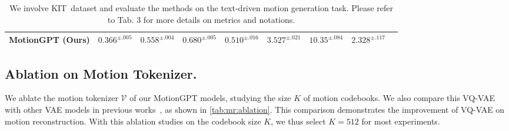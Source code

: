 \begin{table}[h]
{\begin{tabular}{@{}lcccccccc@{}}
\midrule
MotionGPT (Ours) &
$0.366^{\pm.005}$ & $0.558^{\pm.004}$ & $0.680^{\pm.005}$ & $0.510^{\pm.016}$ & $3.527^{\pm.021}$ & $10.35^{\pm.084}$ & 
$2.328^{\pm.117}$
\\\bottomrule
\end{tabular}%
}
\vspace{8pt}
\caption{We involve KIT~\cite{Plappert2016kit}dataset and evaluate the methods on the text-driven motion generation task. Please refer to Tab. 3 for more details on metrics and notations.
}
\label{tab:tm:comp:kit}
\end{table}
     
\subsection{Ablation on Motion Tokenizer.} 
\label{sec:vqvae}
We ablate the motion tokenizer $\mathcal{V}$ of our MotionGPT models, studying the size $K$ of motion codebooks. We also compare this VQ-VAE with other VAE models in previous works~\cite{vposer_SMPL-X:2019, petrovich21actor, chen2023mld}, as shown in \cref{tab:mr:ablation}. This comparison demonstrates the improvement of VQ-VAE on motion reconstruction. With this ablation studies on the codebook size $K$, we thus select $K=512$ for most experiments.



